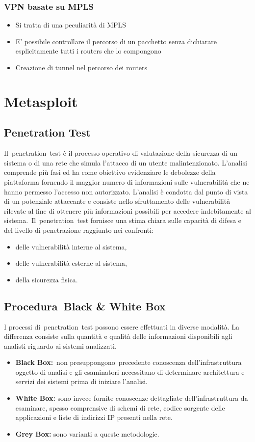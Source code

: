 \documentclass[8pt]{extarticle}
\begin{document}
\subsubsection{VPN basate su MPLS}
\begin{itemize}
    \item Si tratta di una peculiarità  di MPLS
    \item E’ possibile controllare il percorso di un pacchetto senza dichiarare esplicitamente tutti i 
    routers che lo compongono
    \item Creazione di tunnel nel percorso dei routers
\end{itemize}
\section{Metasploit}
\subsection{Penetration Test}
Il penetration test è il processo operativo di valutazione della sicurezza di un sistema o di una rete che 
simula l'attacco di un utente malintenzionato. L'analisi comprende più fasi ed ha come obiettivo evidenziare 
le debolezze della piattaforma fornendo il maggior numero di informazioni sulle vulnerabilità che ne hanno 
permesso l'accesso non autorizzato. L'analisi è condotta dal punto di vista di un potenziale attaccante e 
consiste nello sfruttamento delle vulnerabilità rilevate al fine di ottenere più informazioni possibili 
per accedere indebitamente al sistema. Il penetration test fornisce una stima chiara sulle capacità di 
difesa e del livello di penetrazione raggiunto nei confronti: 
\begin{itemize}
    \item delle vulnerabilità interne al sistema,
    \item delle vulnerabilità esterne al sistema,
    \item della sicurezza fisica.
\end{itemize}
\subsection{Procedura Black \& White Box}
I processi di penetration test possono essere effettuati in diverse modalità. La differenza consiste 
sulla quantità e qualità delle informazioni disponibili agli analisti riguardo ai sistemi analizzati.
\begin{itemize}
    \item \textbf{Black Box:} non presuppongono precedente conoscenza dell'infrastruttura oggetto di analisi 
    e gli esaminatori necessitano di determinare architettura e servizi dei sistemi prima di iniziare l'analisi.
    \item \textbf{White Box:} sono invece fornite conoscenze dettagliate dell'infrastruttura da esaminare, 
    spesso comprensive di schemi di rete, codice sorgente delle applicazioni e liste di indirizzi 
    IP presenti nella rete.
    \item \textbf{Grey Box:} sono varianti a queste metodologie.
\end{itemize}
\end{document}
